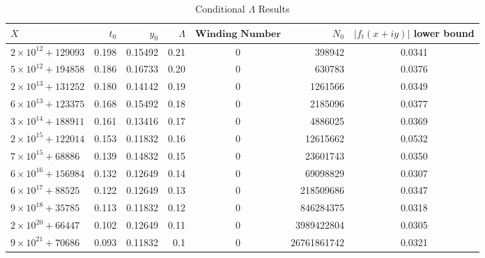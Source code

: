 \documentclass[a4paper,11pt,twoside]{amsart}
\begin{document}
\begin{table}[ht!]
  \begin{center}
    \caption{Conditional $\Lambda$ Results}
    \label{tab:table1}
    \begin{tabular}{l|r|r|r|c|r|c} %
      $X$ & $t_{0}$ & $y_{0}$ & $\Lambda$ & $\textbf{Winding Number}$ & $N_{0}$ & $|f_t(x+iy)|$ lower bound\\
      \hline
      $2 \times 10^{12} + 129093$ & 0.198 & 0.15492 & 0.21 & 0 & 398942 & 0.0341\\
      $5 \times 10^{12} + 194858$ & 0.186 & 0.16733 & 0.20 & 0 & 630783 & 0.0376\\
      $2 \times 10^{13} + 131252$ & 0.180 & 0.14142 & 0.19 & 0 & 1261566 & 0.0349\\
      $6 \times 10^{13} + 123375$ & 0.168 & 0.15492 & 0.18 & 0 & 2185096 & 0.0377\\
      $3 \times 10^{14} + 188911$ & 0.161 & 0.13416 & 0.17 & 0 & 4886025 & 0.0369\\
      $2 \times 10^{15} + 122014$ & 0.153 & 0.11832 & 0.16 & 0 & 12615662 & 0.0532\\
      $7 \times 10^{15} + 68886$ & 0.139 & 0.14832 & 0.15 & 0 & 23601743 & 0.0350\\
      $6 \times 10^{16} + 156984$ & 0.132 & 0.12649 & 0.14 & 0 & 69098829 & 0.0307\\
      $6 \times 10^{17} + 88525$ & 0.122 & 0.12649 & 0.13 & 0 & 218509686 & 0.0347\\
      $9 \times 10^{18} + 35785$ & 0.113 & 0.11832 & 0.12 & 0 & 846284375 & 0.0318\\
      $2 \times 10^{20} + 66447$ & 0.102 & 0.12649 & 0.11 & 0 & 3989422804 & 0.0305\\
      $9 \times 10^{21} + 70686$ & 0.093 & 0.11832 & 0.1 & 0 & 26761861742 & 0.0321\\
    \end{tabular}
  \end{center}
\end{table}
\end{document}
